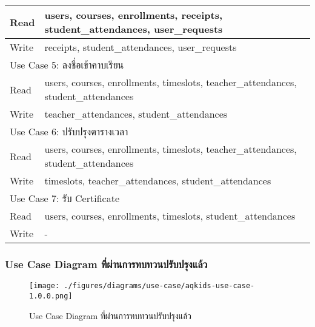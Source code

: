\begin{table}[H]
\begin{tabularx}{\textwidth}{|ll|}
\multicolumn{1}{|l|}{Read}  & users, courses, enrollments, receipts, student\_attendances, user\_requests        \\ \hline
\multicolumn{1}{|l|}{Write} & receipts, student\_attendances, user\_requests                                     \\ \hline
\multicolumn{2}{|l|}{Use Case 5: ลงชื่อเข้าคาบเรียน}                                                             \\ \hline
\multicolumn{1}{|l|}{Read}  & users, courses, enrollments, timeslots, teacher\_attendances, student\_attendances \\ \hline
\multicolumn{1}{|l|}{Write} & teacher\_attendances, student\_attendances                                         \\ \hline
\multicolumn{2}{|l|}{Use Case 6: ปรับปรุงตารางเวลา}                                                              \\ \hline
\multicolumn{1}{|l|}{Read}  & users, courses, enrollments, timeslots, teacher\_attendances, student\_attendances \\ \hline
\multicolumn{1}{|l|}{Write} & timeslots, teacher\_attendances, student\_attendances                              \\ \hline
\multicolumn{2}{|l|}{Use Case 7: รับ Certificate}                                                                \\ \hline
\multicolumn{1}{|l|}{Read}  & users, courses, enrollments, timeslots, student\_attendances                       \\ \hline
\multicolumn{1}{|l|}{Write} & -                                                                                  \\ \hline
\end{tabularx}
\end{table}

\subsubsection{Use Case Diagram ที่ผ่านการทบทวนปรับปรุงแล้ว}

\begin{figure}[H]
\texttt{[image: ./figures/diagrams/use-case/aqkids-use-case-1.0.0.png]}
\caption{Use Case Diagram ที่ผ่านการทบทวนปรับปรุงแล้ว}
\label{fig:aqkids-use-case-final}
\end{figure}


